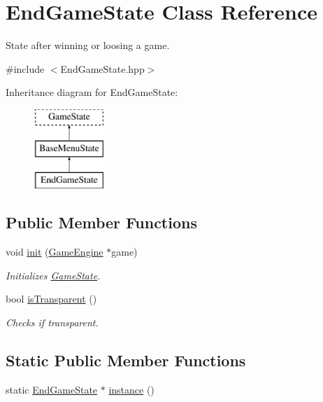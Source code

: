 \hypertarget{class_end_game_state}{}\section{End\+Game\+State Class Reference}
\label{class_end_game_state}


State after winning or loosing a game.  




{\ttfamily \#include $<$End\+Game\+State.\+hpp$>$}

Inheritance diagram for End\+Game\+State\+:\begin{figure}[H]
\begin{center}
\leavevmode
\includegraphics[height=3.000000cm]{class_end_game_state}
\end{center}
\end{figure}
\subsection*{Public Member Functions}
\begin{DoxyCompactItemize}
\item 
void \mbox{\hyperlink{class_end_game_state_ac3abeb54305351ce65b66d519ca3e0c1}{init}} (\mbox{\hyperlink{class_game_engine}{Game\+Engine}} $\ast$game)
\begin{DoxyCompactList}\small\item\em Initializes \mbox{\hyperlink{class_game_state}{Game\+State}}. \end{DoxyCompactList}\item 
bool \mbox{\hyperlink{class_end_game_state_a0cafb4ddc794cdbde37e1624ef02bbf9}{is\+Transparent}} ()
\begin{DoxyCompactList}\small\item\em Checks if transparent. \end{DoxyCompactList}\end{DoxyCompactItemize}
\subsection*{Static Public Member Functions}
\begin{DoxyCompactItemize}
\item 
static \mbox{\hyperlink{class_end_game_state}{End\+Game\+State}} $\ast$ \mbox{\hyperlink{class_end_game_state_acf46076d50ef1a957b0e42a4c7668578}{instance}} ()
\end{DoxyCompactItemize}
